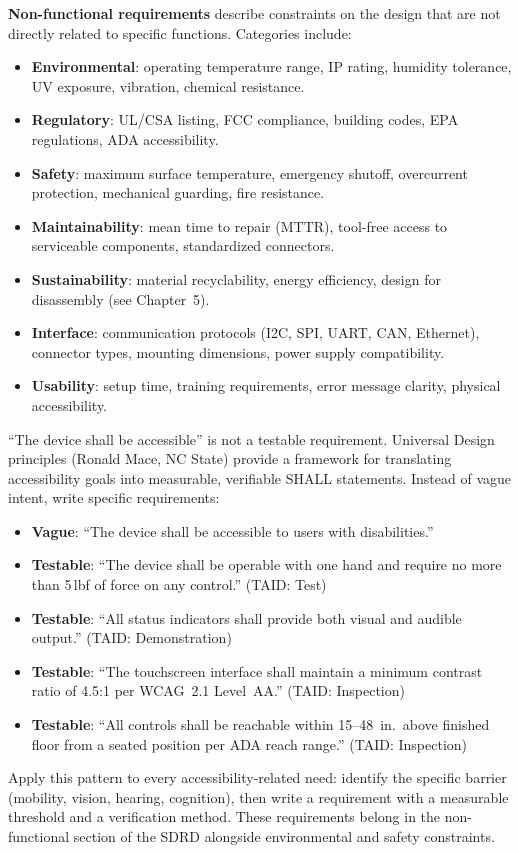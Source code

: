 \textbf{Non-functional requirements} describe constraints on the design that are not directly related to specific functions. Categories include:
\begin{itemize}[nosep,leftmargin=1.5em]
\item \textbf{Environmental}: operating temperature range, IP rating, humidity tolerance, UV exposure, vibration, chemical resistance.
\item \textbf{Regulatory}: UL/CSA listing, FCC compliance, building codes, EPA regulations, ADA accessibility.
\item \textbf{Safety}: maximum surface temperature, emergency shutoff, overcurrent protection, mechanical guarding, fire resistance.
\item \textbf{Maintainability}: mean time to repair (MTTR), tool-free access to serviceable components, standardized connectors.
\item \textbf{Sustainability}: material recyclability, energy efficiency, design for disassembly (see Chapter~5).
\item \textbf{Interface}: communication protocols (I2C, SPI, UART, CAN, Ethernet), connector types, mounting dimensions, power supply compatibility.
\item \textbf{Usability}: setup time, training requirements, error message clarity, physical accessibility.
\end{itemize}

\begin{tipbox}
``The device shall be accessible'' is not a testable requirement. Universal Design principles (Ronald Mace, NC State) provide a framework for translating accessibility goals into measurable, verifiable SHALL statements. Instead of vague intent, write specific requirements:
\begin{itemize}[nosep,leftmargin=1.5em]
\item \textbf{Vague}: ``The device shall be accessible to users with disabilities.''
\item \textbf{Testable}: ``The device shall be operable with one hand and require no more than 5\,lbf of force on any control.'' (TAID: Test)
\item \textbf{Testable}: ``All status indicators shall provide both visual and audible output.'' (TAID: Demonstration)
\item \textbf{Testable}: ``The touchscreen interface shall maintain a minimum contrast ratio of 4.5:1 per WCAG~2.1 Level~AA.'' (TAID: Inspection)
\item \textbf{Testable}: ``All controls shall be reachable within 15--48~in.\ above finished floor from a seated position per ADA reach range.'' (TAID: Inspection)
\end{itemize}
Apply this pattern to every accessibility-related need: identify the specific barrier (mobility, vision, hearing, cognition), then write a requirement with a measurable threshold and a verification method. These requirements belong in the non-functional section of the SDRD alongside environmental and safety constraints.
\end{tipbox}

